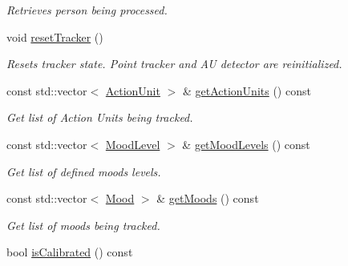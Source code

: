 \begin{DoxyCompactItemize}
\begin{DoxyCompactList}\small\item\em Retrieves person being processed. \end{DoxyCompactList}\item 
void \hyperlink{classinsight_1_1Insight_aba366851a69304955e3762d3f8037196}{reset\+Tracker} ()\hypertarget{classinsight_1_1Insight_aba366851a69304955e3762d3f8037196}{}\label{classinsight_1_1Insight_aba366851a69304955e3762d3f8037196}

\begin{DoxyCompactList}\small\item\em Resets tracker state. Point tracker and AU detector are reinitialized. \end{DoxyCompactList}\item 
const std\+::vector$<$ \hyperlink{classinsight_1_1ActionUnit}{Action\+Unit} $>$ \& \hyperlink{classinsight_1_1Insight_a080a9f073e74ff908b9c80a57c4a0f21}{get\+Action\+Units} () const \hypertarget{classinsight_1_1Insight_a080a9f073e74ff908b9c80a57c4a0f21}{}\label{classinsight_1_1Insight_a080a9f073e74ff908b9c80a57c4a0f21}

\begin{DoxyCompactList}\small\item\em Get list of Action Units being tracked. \end{DoxyCompactList}\item 
const std\+::vector$<$ \hyperlink{classinsight_1_1MoodLevel}{Mood\+Level} $>$ \& \hyperlink{classinsight_1_1Insight_afec9b93c9e3a34e7f88a2364486d0037}{get\+Mood\+Levels} () const \hypertarget{classinsight_1_1Insight_afec9b93c9e3a34e7f88a2364486d0037}{}\label{classinsight_1_1Insight_afec9b93c9e3a34e7f88a2364486d0037}

\begin{DoxyCompactList}\small\item\em Get list of defined moods levels. \end{DoxyCompactList}\item 
const std\+::vector$<$ \hyperlink{classinsight_1_1Mood}{Mood} $>$ \& \hyperlink{classinsight_1_1Insight_a97495fcfb96b05f9410c2f976d6d8005}{get\+Moods} () const \hypertarget{classinsight_1_1Insight_a97495fcfb96b05f9410c2f976d6d8005}{}\label{classinsight_1_1Insight_a97495fcfb96b05f9410c2f976d6d8005}

\begin{DoxyCompactList}\small\item\em Get list of moods being tracked. \end{DoxyCompactList}\item 
bool \hyperlink{classinsight_1_1Insight_a7172711da97520c03e54ae2dadf5d7ea}{is\+Calibrated} () const \hypertarget{classinsight_1_1Insight_a7172711da97520c03e54ae2dadf5d7ea}{}\label{classinsight_1_1Insight_a7172711da97520c03e54ae2dadf5d7ea}


\end{DoxyCompactItemize}
